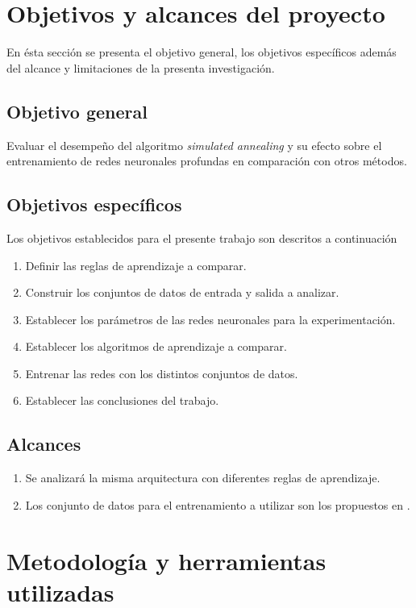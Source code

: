 \section{Objetivos y alcances del proyecto}
En ésta sección se presenta el objetivo general, los objetivos específicos además del alcance y limitaciones de la presenta investigación.

\subsection{Objetivo general}
Evaluar el desempeño del algoritmo {\em simulated annealing} y su efecto sobre el entrenamiento de redes neuronales profundas en comparación con otros métodos.

\subsection{Objetivos específicos}
Los objetivos establecidos para el presente trabajo son descritos a continuación
\begin{enumerate}
	\item Definir las reglas de aprendizaje a comparar.
	\item Construir los conjuntos de datos de entrada y salida a analizar.
	\item Establecer los parámetros de las redes neuronales para la experimentación.
	\item Establecer los algoritmos de aprendizaje a comparar.
	\item Entrenar las redes con los distintos conjuntos de datos.
	\item Establecer las conclusiones del trabajo.
\end{enumerate}

\subsection{Alcances}
\begin{enumerate}
	\item Se analizará la misma arquitectura con diferentes reglas de aprendizaje.
	\item Los conjunto de datos para el entrenamiento a utilizar son los propuestos en \cite{Morse2016}.
\end{enumerate}

\section{Metodología y herramientas utilizadas}
